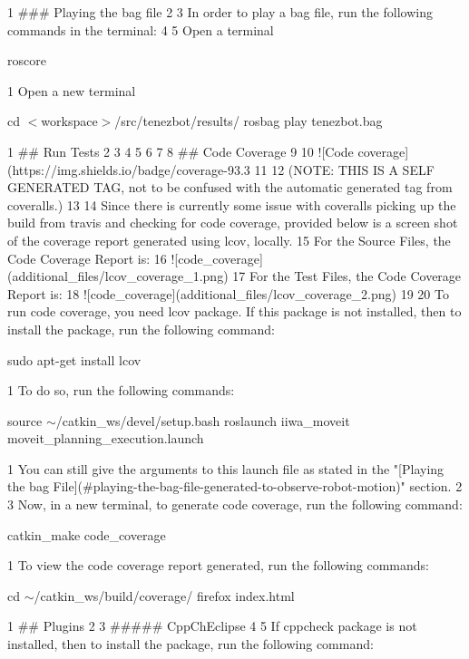 \begin{DoxyCode}
1 ### Playing the bag file
2 
3 In order to play a bag file, run the following commands in the terminal:
4 
5 Open a terminal
\end{DoxyCode}
 roscore 
\begin{DoxyCode}
1 Open a new terminal
\end{DoxyCode}
 cd $<$workspace$>$/src/tenezbot/results/ rosbag play tenezbot.\+bag 
\begin{DoxyCode}
1 ## Run Tests
2 
3 
4 
5 
6 
7 
8 ## Code Coverage
9 
10 ![Code coverage](https://img.shields.io/badge/coverage-93.3%
11 
12 (NOTE: THIS IS A SELF GENERATED TAG, not to be confused with the automatic generated tag from coveralls.)
13 
14 Since there is currently some issue with coveralls picking up the build from travis and checking for code
       coverage, provided below is a screen shot of the coverage report generated using lcov, locally.
15 For the Source Files, the Code Coverage Report is:
16 ![code\_coverage](additional\_files/lcov\_coverage\_1.png)
17 For the Test Files, the Code Coverage Report is:
18 ![code\_coverage](additional\_files/lcov\_coverage\_2.png)
19 
20 To run code coverage, you need lcov package. If this package is not installed, then to install the package,
       run the following command:
\end{DoxyCode}
 sudo apt-\/get install lcov 
\begin{DoxyCode}
1 To do so, run the following commands:
\end{DoxyCode}
 source $\sim$/catkin\+\_\+ws/devel/setup.bash roslaunch iiwa\+\_\+moveit moveit\+\_\+planning\+\_\+execution.\+launch 
\begin{DoxyCode}
1 You can still give the arguments to this launch file as stated in the "[Playing the bag
       File](#playing-the-bag-file-generated-to-observe-robot-motion)" section.
2 
3 Now, in a new terminal, to generate code coverage, run the following command:
\end{DoxyCode}
 catkin\+\_\+make code\+\_\+coverage 
\begin{DoxyCode}
1 To view the code coverage report generated, run the following commands:
\end{DoxyCode}
 cd $\sim$/catkin\+\_\+ws/build/coverage/ firefox index.\+html 
\begin{DoxyCode}
1 ## Plugins
2 
3 ##### CppChEclipse
4 
5 If cppcheck package is not installed, then to install the package, run the following command:
\end{DoxyCode}
